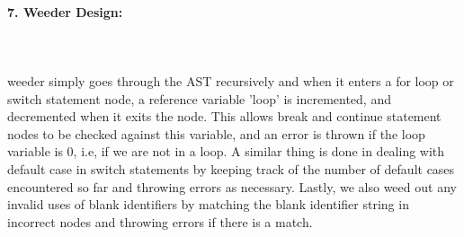 \documentclass{article}
\begin{document}
\paragraph{7. Weeder Design:}\mbox{}\\\\
 weeder simply goes through the AST recursively and when it enters a for loop or switch statement node, a reference variable 'loop' is incremented, and decremented when it exits the node. This allows break and continue statement nodes to be checked against this variable, and an error is thrown if the loop variable is 0, i.e, if we are not in a loop. A similar thing is done in dealing with default case in switch statements by keeping track of the number of default cases encountered so far and throwing errors as necessary. Lastly, we also weed out any invalid uses of blank identifiers by matching the blank identifier string in incorrect nodes and throwing errors if there is a match.
\end{document}
